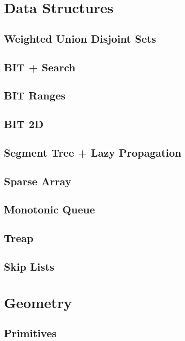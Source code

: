 	\section{Data Structures}
		\subsection{Weighted Union Disjoint Sets}
			
		\subsection{BIT + Search}
			
		\subsection{BIT Ranges}
			
		\subsection{BIT 2D}
			
		\subsection{Segment Tree + Lazy Propagation}
			
		\subsection{Sparse Array}
			
		\subsection{Monotonic Queue}
			
		\subsection{Treap}
			
		\subsection{Skip Lists}
			
	\section{Geometry}
		\subsection{Primitives}
			
